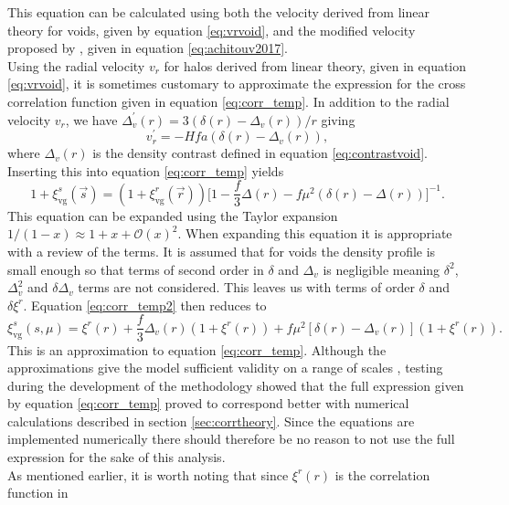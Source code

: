 This equation can be calculated using both the velocity derived from linear theory for voids, given by equation \ref{eq:vrvoid}, and the modified velocity proposed by \cite{Achitouv_streaming}, given in equation \ref{eq:achitouv2017}.
\\\indent
Using the radial velocity $v_r$ for halos derived from linear theory, given in equation \ref{eq:vrvoid}, it is sometimes customary to approximate the expression for the cross correlation function given in equation \ref{eq:corr_temp}. In addition to the radial velocity $v_r$, we have $\Delta_v^\prime(r)=3(\delta(r)-\Delta_v(r))/r$ giving
\begin{equation}
    v_r^\prime=-Hfa(\delta(r)-\Delta_v(r)),
\end{equation}
where $\Delta_v(r)$ is the density contrast defined in equation
\ref{eq:contrastvoid}. Inserting this into equation \ref{eq:corr_temp} yields
\begin{equation}\label{eq:corr_temp2}
    1 + \xi^s_{\mathrm{vg}}(\vec{s})=(1 + \xi^r_{\mathrm{vg}}(\vec{r})) \Big[1 -\frac{f}{3}\Delta(r)-f\mu^2(\delta(r)-\Delta(r))\Big]^{-1}.
\end{equation}
This equation can be expanded using the Taylor expansion
$1/(1-x)\approx1+x+\mathcal{O}(x)^2$. When expanding this equation it is
appropriate with a review of the terms. It is
assumed that for voids the density profile is small enough so that terms of
second order in $\delta$ and $\Delta_{v}$ is negligible meaning $\delta^2$,
$\Delta_{v}^2$ and $\delta\Delta_v$ terms are not considered. This leaves us with terms
of order $\delta$ and  $\delta\xi^r$. Equation
\ref{eq:corr_temp2} then reduces to
\begin{equation}\label{eq:corr_no_stream}
    \xi^{s}_{\mathrm{vg}}(s,\mu)=\xi^r(r)+\frac{f}{3}\Delta_v(r)(1+\xi^r(r))+f\mu^2[\delta(r)-\Delta_v(r)](1+\xi^r(r)).
\end{equation}
This is an approximation to equation \ref{eq:corr_temp}. Although the approximations give
the model sufficient validity on a range of scales \cite{BeyondBAO}, testing during the development of the methodology showed that the full expression given by equation \ref{eq:corr_temp} proved to correspond better with numerical calculations described in section \ref{sec:corrtheory}. Since the equations are implemented numerically there should therefore be no reason to not use the full expression for the sake of this analysis.\\\indent
As mentioned earlier, it is worth noting that since $\xi^r(r)$ is the correlation function in
